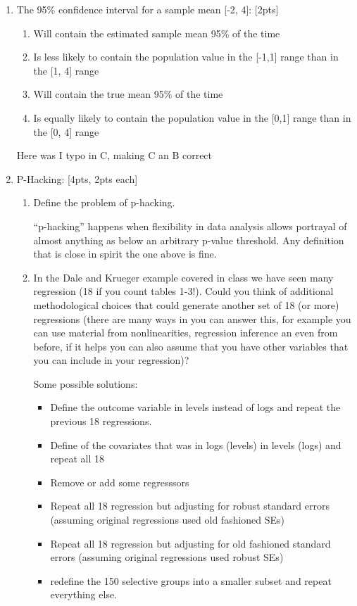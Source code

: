 \documentclass[answers]{exam}
\begin{document}
\begin{enumerate}
\item The 95\% confidence interval for a sample mean [-2, 4]: [2pts]
    \begin{enumerate}[label=\alph*)]
        \item Will contain the estimated sample mean 95\% of the time
        \item Is less likely to contain the population value in the [-1,1] range than in the [1, 4] range
        \item Will contain the true mean 95\% of the time
        \item Is equally likely to contain the population value in the [0,1] range than in the [0, 4] range
    \end{enumerate}
\begin{solution}
Here was I typo in C, making C an B correct
\end{solution}

\item P-Hacking: [4pts, 2pts each] 
\begin{enumerate}[label=\alph*)]
    \item Define the problem of p-hacking. 
   \begin{solution}
   “p-hacking” happens when flexibility in data analysis allows portrayal of almost anything as below an arbitrary p-value threshold. 
   Any definition that is close in spirit the one above is fine. 
   \end{solution}
    \item In the Dale and Krueger example covered in class we have seen many regression (18 if you count tables 1-3!). Could you think of additional methodological choices that could generate another set of 18 (or more) regressions (there are many ways in you can answer this, for example you can use material from nonlinearities, regression inference an even from before, if it helps you can also assume that you have other variables that you can include in your regression)?
    \begin{solution}
    Some possible solutions: 
    \begin{itemize}
        \item Define the outcome variable in levels instead of logs and repeat the previous 18 regressions. 
        \item Define of the covariates that was in logs (levels) in levels (logs) and repeat all 18
        \item Remove or add some regresssors
        \item Repeat all 18 regression but adjusting for robust standard errors (assuming original regressions used old fashioned SEs)
        \item Repeat all 18 regression but adjusting for old fashioned standard errors (assuming original regressions used robust SEs)
        \item redefine the 150 selective groups into a smaller subset and repeat everything else.
    \end{itemize}
    \end{solution}
    \end{enumerate}


\end{enumerate}
\end{document}
